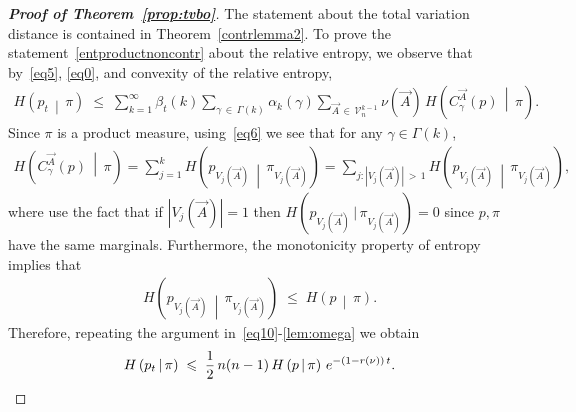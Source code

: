 \documentclass[AHL,Unicode,longabstracts,published]{cedram}
\renewcommand{\leq}{\;\leqslant\;}
\newcommand{\tc}{\, |\, }
\newcommand{\cV}{\mathcal{V}}
\let\b=\beta
\let\g=\gamma
\let\G=\Gamma
\begin{document}
\begin{proof}[{\bf Proof of Theorem~\ref{prop:tvbo}}]
The statement about the total variation distance is contained in Theorem~\ref{contrlemma2}. To prove the statement~\eqref{entproductnoncontr} about the relative entropy, we observe that by~\eqref{eq5}, \eqref{eq0}, and convexity of the relative entropy,
\begin{align}
H\left(p_t\,\middle|\, \pi\right) \leq \sum_{k=1}^{\infty}\b_t(k)\sum_{\gamma\,\in \,\Gamma(k)}\alpha_k(\gamma)\sum_{\vec A\,\in \,\cV_n^{k-1}}\nu(\vec A) \,H\left(C_{\gamma}^{\vec{A}}(p)\,\middle|\, \pi\right).
\end{align}
Since $\pi$ is a product measure, using~\eqref{eq6} we see that for any $\g\in\G(k)$,
\begin{align}
H\left(C_{\gamma}^{\vec{A}}(p)\,\middle|\,  \pi\right) = \sum_{j=1}^k H\left(p_{V_j(\vec A)}\,\middle|\, \pi_{V_j(\vec{A})}\right) =
\sum_{j : \left|V_j(\vec{A})\right|\,>\,1}H\left(p_{V_j(\vec A)}\,\middle|\,  \pi_{V_j(\vec{A})}\right),
\end{align}
where use the fact that if $|V_j(\vec A)|= 1$ then $H(p_{V_j(\vec A)}\tc\pi_{V_j(\vec{A})})=0$ since $p,\pi$ have the same marginals. Furthermore, the monotonicity property of entropy implies that
\begin{align}
H\left(p_{V_j(\vec A)}\,\middle|\,  \pi_{V_j(\vec{A})}\right) \leq H\left(p\,\middle|\,  \pi\right).
\end{align}
Therefore, repeating the argument in~\eqref{eq10}-\eqref{lem:omega} we obtain
\begin{equation}
H\left(p_t\,\middle|\,  \pi\right) \leq
\frac12\,n(n-1)\,H\left(p\,\middle|\,  \pi\right) \,e^{-(1-r(\nu))\,t}.\qedhere
\end{equation}
\end{proof}
\end{document}
